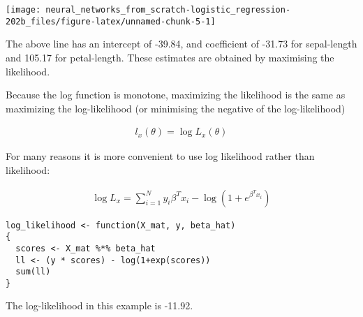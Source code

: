 \documentclass[]{book}
\newenvironment{Shaded}{\begin{snugshade}}{\end{snugshade}}
\newcommand{\CommentTok}[1]{\textcolor[rgb]{0.56,0.35,0.01}{\textit{#1}}}
\newcommand{\ControlFlowTok}[1]{\textcolor[rgb]{0.13,0.29,0.53}{\textbf{#1}}}
\newcommand{\DecValTok}[1]{\textcolor[rgb]{0.00,0.00,0.81}{#1}}
\newcommand{\KeywordTok}[1]{\textcolor[rgb]{0.13,0.29,0.53}{\textbf{#1}}}
\newcommand{\NormalTok}[1]{#1}
\newcommand{\OperatorTok}[1]{\textcolor[rgb]{0.81,0.36,0.00}{\textbf{#1}}}
\newcommand{\StringTok}[1]{\textcolor[rgb]{0.31,0.60,0.02}{#1}}
\begin{document}
\begin{center}\texttt{[image: neural\_networks\_from\_scratch-logistic\_regression-202b\_files/figure-latex/unnamed-chunk-5-1]} \end{center}

The above line has an intercept of -39.84, and coefficient of -31.73 for sepal-length and 105.17 for petal-length. These estimates are obtained by maximising the likelihood.

Because the log function is monotone, maximizing the likelihood is the same as maximizing the log-likelihood (or minimising the negative of the log-likelihood)

\[\begin{aligned} 
   l_x(\theta) = \log L_x(\theta)
\end{aligned}\]

For many reasons it is more convenient to use log likelihood rather than likelihood:

\[\begin{aligned}
   \log L_x
   =
   \sum_{i=1}^{N} y_i\beta^Tx_i - \log(1+e^{\beta^Tx_i})  
\end{aligned}\]

\begin{verbatim}
log_likelihood <- function(X_mat, y, beta_hat)
{
  scores <- X_mat %*% beta_hat
  ll <- (y * scores) - log(1+exp(scores))
  sum(ll)
}
\end{verbatim}

The log-likelihood in this example is -11.92.

\begin{Shaded}
\end{Shaded}
\end{document}
